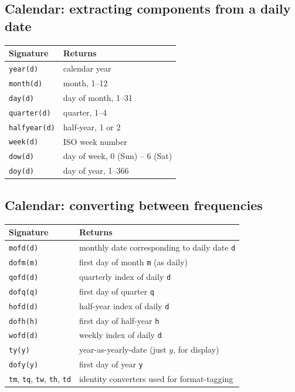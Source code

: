 \documentclass[11pt,letterpaper]{article}
\begin{document}
\subsection{Calendar: extracting components from a daily date}

\begin{center}
\begin{tabular}{ll}
\toprule
Signature & Returns \\
\midrule
\texttt{year(d)} & calendar year \\
\texttt{month(d)} & month, 1--12 \\
\texttt{day(d)} & day of month, 1--31 \\
\texttt{quarter(d)} & quarter, 1--4 \\
\texttt{halfyear(d)} & half-year, 1 or 2 \\
\texttt{week(d)} & ISO week number \\
\texttt{dow(d)} & day of week, 0 (Sun) -- 6 (Sat) \\
\texttt{doy(d)} & day of year, 1--366 \\
\bottomrule
\end{tabular}
\end{center}

\subsection{Calendar: converting between frequencies}

\begin{center}
\begin{tabular}{ll}
\toprule
Signature & Returns \\
\midrule
\texttt{mofd(d)} & monthly date corresponding to daily date \texttt{d} \\
\texttt{dofm(m)} & first day of month \texttt{m} (as daily) \\
\texttt{qofd(d)} & quarterly index of daily \texttt{d} \\
\texttt{dofq(q)} & first day of quarter \texttt{q} \\
\texttt{hofd(d)} & half-year index of daily \texttt{d} \\
\texttt{dofh(h)} & first day of half-year \texttt{h} \\
\texttt{wofd(d)} & weekly index of daily \texttt{d} \\
\texttt{ty(y)} & year-as-yearly-date (just $y$, for display) \\
\texttt{dofy(y)} & first day of year \texttt{y} \\
\texttt{tm}, \texttt{tq}, \texttt{tw}, \texttt{th}, \texttt{td} & identity converters used for format-tagging \\
\bottomrule
\end{tabular}
\end{center}
\end{document}
